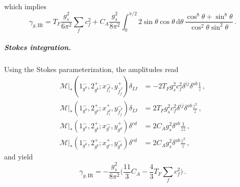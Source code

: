 \begin{subappendices}
\begin{multline}
\end{multline}
which implies
\begin{equation}\label{eq:ALPgammaIRgluon_angular}
    \gamma_{g,\text{IR}} =T_F\frac{g_s^2}{6\pi^2}\sum_f c_f^2 +C_A\frac{g_s^2}{8\pi^2}\int_0^{\pi/2}2\sin\theta\cos\theta \,\text{d}\theta \, \frac{\cos^8\theta + \sin^8\theta}{\cos^2\theta \sin^2\theta} \,.
\end{equation}

\subparagraph{Stokes integration.}
Using the Stokes parameterization, the amplitudes read
\begin{align}
    \mathcal M|_*(1^-_{g^a},2^+_{g^b};x_{f_i^I}^{-},y_{\bar f_j^J}^{+})\delta_{IJ} &= -2T_Fg_s^2c_f^2\delta^{ij}\delta^{ab}\frac{1}{z}\,, \\
    \mathcal M|_*(1^-_{g^a},2^+_{g^b};x_{f_i^I}^{+},y_{\bar f_j^J}^{-})\delta_{IJ} &= 2T_Fg_s^2c_f^2\delta^{ij}\delta^{ab}\frac{\bar z^2}{z}\,,\\
    \mathcal M|_* (1^-_{g^a},2^+_{g^b};x_{g^c}^{-},y_{g^d}^{+}) \delta^{cd} &= 2C_A g_s^2\delta^{ab}\frac{1}{z \bar z}\,, \\
    \mathcal M|_* (1^-_{g^a},2^+_{g^b};x_{g^c}^{+},y_{g^d}^{-}) \delta^{cd} &=2C_A g_s^2\delta^{ab}\frac{ \bar z^3}{z }\,,
\end{align}
and yield
\begin{equation}\label{eq:ALPgammaIRgluon_stokes}
    \gamma_{g,\text{IR}} =-\frac{g_s^2}{8\pi^2}\bigg(\frac{11}{3}C_A -\frac{4}{3}T_F\sum_fc_f^2\bigg) \,.
\end{equation}

\end{subappendices}

